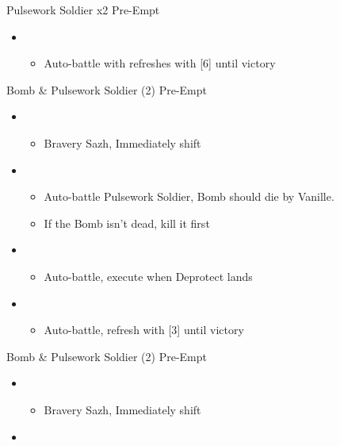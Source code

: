 \begin{paracol}{2}
\begin{battle}{Pulsework Soldier x2 Pre-Empt}
\begin{itemize}
\begin{itemize}
				      \item Auto-battle a Deprotected Pulsework Soldier until both are Deprotected
			      \end{itemize}
			\item \first
			      \begin{itemize}
				      \item Auto-battle with refreshes with [6] until victory
			      \end{itemize}
		\end{itemize}
	\end{battle}
	\switchcolumn*
	\begin{battle}{Bomb \& Pulsework Soldier (2) Pre-Empt}
		\begin{itemize}
			\item \second
			      \begin{itemize}
				      \item Bravery Sazh, Immediately shift
			      \end{itemize}
			\item \first
			      \begin{itemize}
				      \item Auto-battle Pulsework Soldier, Bomb should die by Vanille.
				      \item If the Bomb isn't dead, kill it first
			      \end{itemize}
			\item \third
			      \begin{itemize}
				      \item Auto-battle, execute when Deprotect lands
			      \end{itemize}
			\item \first
			      \begin{itemize}
				      \item Auto-battle, refresh with [3] until victory
			      \end{itemize}
		\end{itemize}
	\end{battle}
	\switchcolumn
	\begin{battle}{Bomb \& Pulsework Soldier (2) Pre-Empt}
		\begin{itemize}
			\item \second
			      \begin{itemize}
				      \item Bravery Sazh, Immediately shift
			      \end{itemize}
			\item \first

\end{itemize}
\end{battle}
\end{paracol}
